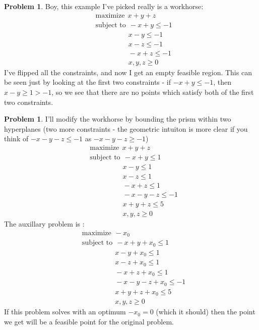 \documentclass[letterpaper,12pt]{article}
\theoremstyle{definition}
\newtheorem{problem}[theorem]{Problem}
\begin{document}
\begin{problem}{8.10}
Boy, this example I've picked really is a workhorse:
\begin{align*}
&\text{maximize} \ \ x + y + z \\
  &\text{subject to} \ \ -x + y \leq -1 \\
  &\qquad \qquad \ \ \ x - y \leq -1 \\
  &\qquad \qquad \ \ \ x - z \leq -1 \\
  &\qquad \qquad \ \ \ -x + z \leq -1 \\
  &\qquad \qquad \ \ \ x, y ,z \geq 0
\end{align*}
I've flipped all the constraints, and now I get an empty feasible region. This can be seen just by looking at the first two constraints - if $-x+y \leq -1$, then $x-y \geq 1 > -1 $, so we see that there are no points which satisfy both of the first two constraints.
\end{problem}

\begin{problem}{8.11}
I'll modify the workhorse by bounding the prism within two hyperplanes (two more constraints - the geometric intuiton is more clear if you think of $- x - y - z \leq -1$ as $- x - y - z \geq -1$)
\begin{align*}
&\text{maximize} \ \ x + y + z \\
  &\text{subject to} \ \ -x + y \leq 1 \\
  &\qquad \qquad \ \ \ x - y \leq 1 \\
  &\qquad \qquad \ \ \ x - z \leq 1 \\
  &\qquad \qquad \ \ \ -x + z \leq 1 \\
  &\qquad \qquad \ \ \ - x - y - z \leq -1 \\
  &\qquad \qquad \ \ \ x + y + z \leq 5 \\
  &\qquad \qquad \ \ \ x, y ,z \geq 0
\end{align*}
The auxillary problem is :
\begin{align*}
&\text{maximize} \ \ -x_0 \\
  &\text{subject to} \ \ -x + y + x_0 \leq 1 \\
  &\qquad \qquad \ \ \ x - y + x_0\leq 1 \\
  &\qquad \qquad \ \ \ x - z + x_0 \leq 1 \\
  &\qquad \qquad \ \ \ -x + z + x_0\leq 1 \\
  &\qquad \qquad \ \ \ - x - y - z + x_0 \leq -1 \\
  &\qquad \qquad \ \ \ x + y + z + x_0 \leq 5 \\
  &\qquad \qquad \ \ \ x, y ,z \geq 0
\end{align*}
If this problem solves with an optimum $-x_0 = 0$ (which it should) then the point we get will be a feasible point for the original problem.
\end{problem}
\end{document}

